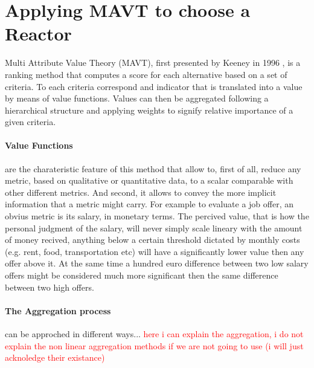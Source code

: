 \section{Applying MAVT to choose a Reactor}
Multi Attribute Value Theory (MAVT), first presented by Keeney in 1996 \cite{KEENEY1996537}, is a ranking method that computes a score for each alternative based on a set of criteria. To each criteria correspond and indicator that is translated into a value by means of value functions. Values can then be aggregated following a hierarchical structure and applying weights to signify relative importance of a given criteria.

\paragraph{Value Functions}
are the charateristic feature of this method that allow to, first of all, reduce any metric, based on qualitative or quantitative data, to a scalar comparable with other different metrics. And second, it allows to convey the more implicit information that a metric might carry. For example to evaluate a job offer, an obvius metric is its salary, in monetary terms. The percived value, that is how the personal judgment of the salary, will never simply scale lineary with the amount of money recived, anything below a certain threshold dictated by monthly costs (e.g. rent, food, transportation etc) will have a significantly lower value then any offer above it. At the same time a hundred euro difference between two low salary offers might be considered much more significant then the same difference between two high offers. 

\paragraph{The Aggregation process}
can be approched in different ways...
\textcolor{red}{here i can explain the aggregation, i do not explain the non linear aggregation methods if we are not going to use (i will just acknoledge their existance)}


